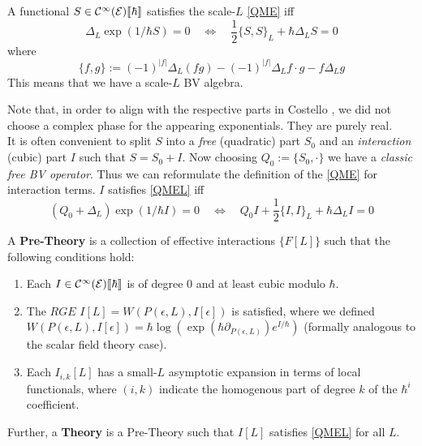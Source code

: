 \begin{definition}
  A functional $S \in \mathcal{C}^{\infty}({\mathcal{E}})\llbracket\hbar\rrbracket$ satisfies the scale-$L$ \eqref{QME} iff
  \begin{equation} \tag{$[QME]_L$} \label{QMEL}
    \Delta_L \exp\left( 1/\hbar S \right) = 0 \quad \iff \quad \frac{1}{2} \{S,S\}_L + \hbar \Delta_L S = 0
  \end{equation}
  where
  \begin{equation}
    \{f,g\} := (-1)^{|f|} \Delta_L (fg) - (-1)^{|f|} \Delta_L f \cdot g - f \Delta_L g
  \end{equation}
  This means that we have a scale-$L$ BV algebra.
\end{definition}

Note that, in order to align with the respective parts in Costello \cite{Costello}, we did not choose a complex phase for the appearing exponentials. They are purely real.\\

It is often convenient to split $S$ into a \emph{free} (quadratic) part $S_0$ and an \emph{interaction} (cubic) part $I$ such that $S = S_0 + I$. Now choosing $Q_0 := \{S_0, \cdot \}$ we have a \emph{classic free BV operator}. Thus we can reformulate the definition of the \eqref{QME} for interaction terms. $I$ satisfies \eqref{QMEL} iff
\begin{equation}
  (Q_0 + \Delta_L) \exp(1/\hbar I) = 0 \quad \iff \quad Q_0 I + \frac{1}{2} \{I,I\}_L + \hbar \Delta_L I = 0
\end{equation}

\begin{definition}
  A \textbf{Pre-Theory} is a collection of effective interactions $\{F[L]\}$ such that the following conditions hold:
  \begin{enumerate}
    \item Each $I \in \mathcal{C}^{\infty}({\mathcal{E}})\llbracket\hbar\rrbracket$ is of degree $0$ and at least cubic modulo $\hbar$.
    \item The $RGE$ $I[L] = W(P(\epsilon, L), I[\epsilon])$ is satisfied, where we defined $W(P(\epsilon, L), I[\epsilon]) = \hbar \log \left( \exp(\hbar \partial_{P(\epsilon,L)}) e^{I/\hbar} \right)$ (formally analogous to the scalar field theory case).
    \item Each $I_{i,k}[L]$ has a small-$L$ asymptotic expansion in terms of local functionals, where $(i,k)$ indicate the homogenous part of degree $k$ of the $\hbar^i$ coefficient.
  \end{enumerate}
  Further, a \textbf{Theory} is a Pre-Theory such that $I[L]$ satisfies \eqref{QMEL} for all $L$.
\end{definition}

